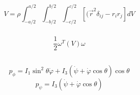\documentclass{report}
\newcommand{\vphi}{\varphi}
\begin{document}
\chapter{}

\chapter{}

\chapter{}

\chapter{}

\chapter{}

\chapter{}

\section{}

\subsection{}

$$V=\rho\int_{-a/2}^{a/2}\int_{-b/2}^{b/2}\int_{-c/2}^{c/2}[(\vec{r}^2\delta_{ij}-r_ir_j]dV$$

\subsection{}

$$\frac{1}{2}\omega^T(V)\omega$$

\section{}

\subsection{}

$$p_\phi=I_1\sin^2\theta\dot\vphi+I_3(\dot\psi+\dot\vphi\cos\theta)\cos\theta$$
$$p_\psi=I_3(\dot\psi+\dot\vphi\cos\theta)$$
\end{document}
